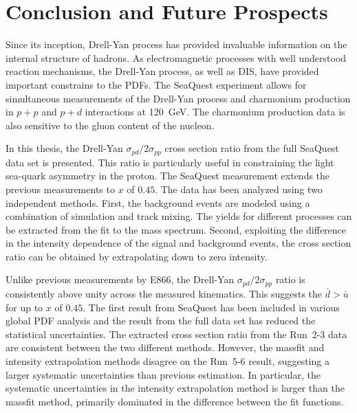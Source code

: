 \documentclass[../main.tex]{subfiles}
\begin{document}
\ifSubfilesClassLoaded{
	\mainmatter
	\setcounter{chapter}{5}
}{}

\chapter{Conclusion and Future Prospects}
\label{ch:conclusion}
Since its inception, Drell-Yan process has provided invaluable information
on the internal structure of hadrons.
As electromagnetic processes with well understood reaction mechanisms,
the Drell-Yan process, as well as DIS, have provided important constrains to the PDFs. 
The SeaQuest experiment allows for simultaneous measurements of the Drell-Yan process
and charmonium production in $p+p$ and $p+d$ interactions at \SI{120}{\GeV}.
The charmonium production data is also sensitive to the gluon content of the nucleon.

In this thesis, the Drell-Yan $\sigma_{pd}/2\sigma_{pp}$ cross section ratio from the full
SeaQuest data set is presented. This ratio is particularly useful in constraining
the light sea-quark asymmetry in the proton. The SeaQuest measurement extends the
previous measurements to $x$ of $0.45$.
The data has been analyzed using two independent methods.
First, the background events are modeled using a combination of simulation and
track mixing. The yields for different processes can be extracted from the fit to
the mass spectrum.
Second, exploiting the difference in the intensity dependence of the signal and background events,
the cross section ratio can be obtained by extrapolating down to zero intensity.

Unlike previous measurements by E866, the  Drell-Yan $\sigma_{pd}/2\sigma_{pp}$ ratio
is consistently above unity across the measured kinematics.
This suggests the $\bar{d}>\bar{u}$ for up to $x$ of $0.45$.
The first result from SeaQuest has been included in various global PDF analysis
and the result from the full data set has reduced the statistical uncertainties.
The extracted cross section ratio from the Run~2-3
data are consistent between the two different methods. However, the massfit
and intensity extrapolation methods disagree on the Run~5-6 result,
suggesting a larger systematic uncertainties than previous estimation.
In particular, the systematic uncertainties in the intensity extrapolation
method is larger than the massfit method, primarily dominated in the difference
between the fit functions.
\end{document}
